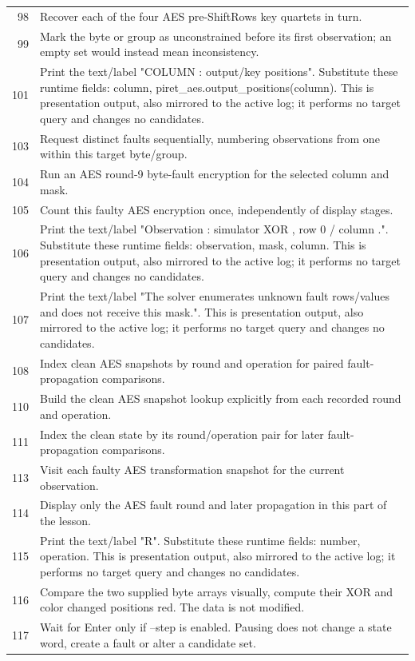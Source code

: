 \begin{longtable}{r >{\raggedright\arraybackslash}p{138mm}}
98&Recover each of the four AES pre-ShiftRows key quartets in turn.\\
99&Mark the byte or group as unconstrained before its first observation; an empty set would instead mean inconsistency.\\
101&Print the text/label "COLUMN  : output/key positions". Substitute these runtime fields: column, piret\_aes.output\_positions(column). This is presentation output, also mirrored to the active log; it performs no target query and changes no candidates.\\
103&Request distinct faults sequentially, numbering observations from one within this target byte/group.\\
104&Run an AES round-9 byte-fault encryption for the selected column and mask.\\
105&Count this faulty AES encryption once, independently of display stages.\\
106&Print the text/label "Observation  : simulator XOR  , row 0 / column  .". Substitute these runtime fields: observation, mask, column. This is presentation output, also mirrored to the active log; it performs no target query and changes no candidates.\\
107&Print the text/label "The solver enumerates unknown fault rows/values and does not receive this mask.". This is presentation output, also mirrored to the active log; it performs no target query and changes no candidates.\\
108&Index clean AES snapshots by round and operation for paired fault-propagation comparisons.\\
110&Build the clean AES snapshot lookup explicitly from each recorded round and operation.\\
111&Index the clean state by its round/operation pair for later fault-propagation comparisons.\\
113&Visit each faulty AES transformation snapshot for the current observation.\\
114&Display only the AES fault round and later propagation in this part of the lesson.\\
115&Print the text/label "R". Substitute these runtime fields: number, operation. This is presentation output, also mirrored to the active log; it performs no target query and changes no candidates.\\
116&Compare the two supplied byte arrays visually, compute their XOR and color changed positions red. The data is not modified.\\
117&Wait for Enter only if --step is enabled. Pausing does not change a state word, create a fault or alter a candidate set.\\

\end{longtable}
